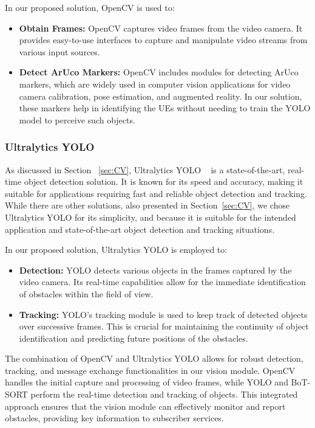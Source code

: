 In our proposed solution, OpenCV is used to:
\begin{itemize}
    \item \textbf{Obtain Frames:} OpenCV captures video frames from the video camera.
    It provides easy-to-use interfaces to capture and manipulate video streams from various input sources.
    \item \textbf{Detect ArUco Markers:} OpenCV includes modules for detecting ArUco markers, which are widely used in computer vision applications for video camera calibration, pose estimation, and augmented reality.
    In our solution, these markers help in identifying the UEs without needing to train the YOLO model to perceive such objects.
\end{itemize}

\subsubsection{Ultralytics YOLO}
As discussed in Section ~\ref{sec:CV}, Ultralytics YOLO ~\cite{ultralytics_docs} is a state-of-the-art, real-time object detection solution.
It is known for its speed and accuracy, making it suitable for applications requiring fast and reliable object detection and tracking.
While there are other solutions, also presented in Section~\ref{sec:CV}, we chose Ultralytics YOLO for its simplicity, and because it is suitable for the intended application and state-of-the-art object detection and tracking situations.

In our proposed solution, Ultralytics YOLO is employed to:
\begin{itemize}
    \item \textbf{Detection:} YOLO detects various objects in the frames captured by the video camera.
    Its real-time capabilities allow for the immediate identification of obstacles within the field of view.
    \item \textbf{Tracking:} YOLO’s tracking module is used to keep track of detected objects over successive frames.
    This is crucial for maintaining the continuity of object identification and predicting future positions of the obstacles. %
\end{itemize}

The combination of OpenCV and Ultralytics YOLO allows for robust detection, tracking, and message exchange functionalities in our vision module.
OpenCV handles the initial capture and processing of video frames, while YOLO and BoT-SORT perform the real-time detection and tracking of objects.
This integrated approach ensures that the vision module can effectively monitor and report obstacles, providing key information to subscriber services.

